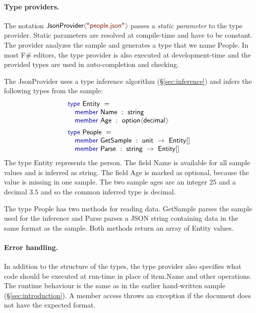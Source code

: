\documentclass[10pt,preprint,blind,clearpagebib]{sigplanconf}
\newcommand{\langl}{\begin{picture}(4.5,7)
\put(1.1,2.5){\rotatebox{60}{\line(1,0){5.5}}}
\put(1.1,2.5){\rotatebox{300}{\line(1,0){5.5}}}
\end{picture}}
\newcommand{\rangl}{\begin{picture}(4.5,7)
\put(.9,2.5){\rotatebox{120}{\line(1,0){5.5}}}
\put(.9,2.5){\rotatebox{240}{\line(1,0){5.5}}}
\end{picture}}
\newcommand{\kvd}[1]{\textnormal{\textcolor{kvdclr}{\sffamily #1}}}
\newcommand{\str}[1]{\textnormal{\textcolor{strclr}{\sffamily "#1"}}}
\newcommand{\ident}[1]{\textnormal{\sffamily #1}}
\begin{document}
\paragraph{Type providers.}
The notation $\ident{JsonProvider}\langl\str{people.json}\rangl$ passes a \emph{static parameter} 
to the type provider. Static parameters are resolved at compile-time and have to be constant. 
The provider analyzes the sample and generates a type that we name \ident{People}. In most F\# 
editors, the type provider is also executed at development-time and the provided types are 
used in auto-completion and checking.

The \ident{JsonProvider} uses a type inference algorithm (\S\ref{sec:inference})  and
infers the following types from the sample:
%
\begin{equation*}
\begin{array}{l}
 \kvd{type}~\ident{Entity}~=  \\
 \quad \kvd{member}~\ident{Name}~:~\ident{string} \\
 \quad \kvd{member}~\ident{Age}~:~\ident{option}\langl \ident{decimal}\rangl \\[0.5em]
 \kvd{type}~\ident{People}~=  \\
 \quad \kvd{member}~\ident{GetSample}~:~\ident{unit}~\rightarrow~\ident{Entity}[] \\
 \quad \kvd{member}~\ident{Parse}~:~\ident{string}~\rightarrow~\ident{Entity}[] \\
\end{array}
\end{equation*}
%
The type \ident{Entity} represents the person. The field \ident{Name} is available for all
sample values and is inferred as \ident{string}. The field \ident{Age} is marked as optional,
because the value is missing in one sample. The two sample ages are an integer $25$ and a 
decimal $3.5$ and so the common inferred type is \ident{decimal}.

The type \ident{People} has two methods for reading data. \ident{GetSample} parses the
sample used for the inference and \ident{Parse} parses a JSON string containing data in the same 
format as the sample. Both methods return an array of \ident{Entity} values.

\paragraph{Error handling.}
In addition to the structure of the types, the type provider also specifies what code should be 
executed at run-time in place of \ident{item.Name} and other operations. The runtime behaviour is 
the same as in the earlier hand-written sample (\S\ref{sec:introduction}). A member access 
throws an exception if the document does not have the expected format.
\end{document}

